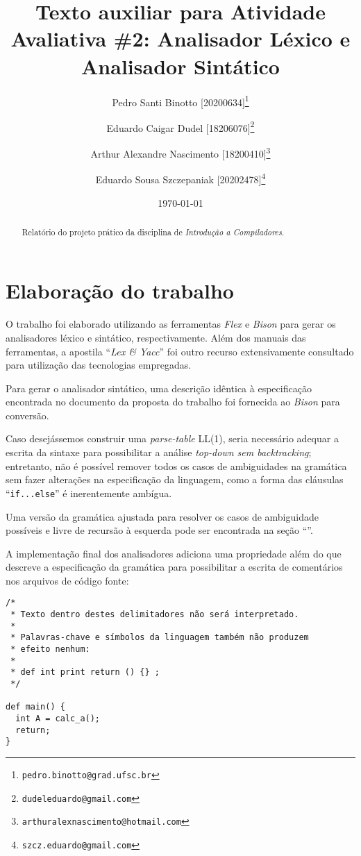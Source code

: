 \documentclass[12pt]{article}
\title{Texto auxiliar para Atividade Avaliativa \#2: Analisador Léxico e Analisador Sintático}
\author[1]{Pedro Santi Binotto [20200634]\thanks{\texttt{pedro.binotto@grad.ufsc.br}}}
\author[2]{Eduardo Caigar Dudel [18206076]\thanks{\texttt{dudeleduardo@gmail.com}}}
\author[3]{Arthur Alexandre Nascimento [18200410]\thanks{\texttt{arthuralexnascimento@hotmail.com}}}
\author[4]{Eduardo Sousa Szczepaniak [20202478]\thanks{\texttt{szcz.eduardo@gmail.com}}}
\date{\today}
\affil[1]{Departamento de Informática e Estatística, Universidade Federal de Santa Catarina}
\begin{document}
\begin{titlepage}
\maketitle
\thispagestyle{empty}

\begin{abstract}
  Relatório do projeto prático da disciplina de \textit{Introdução a Compiladores}.
\end{abstract}

\end{titlepage}

\newpage
\tableofcontents

\newpage
\section{Elaboração do trabalho}
\paragraph{}
O trabalho foi elaborado utilizando as ferramentas \textit{Flex}\cite{mitFlex1990} e \textit{Bison}\cite{mitBison1992}
para gerar os analisadores léxico e sintático, respectivamente. Além dos manuais das ferramentas, a apostila
``\textit{Lex \& Yacc}''\cite{niemannYacc} foi outro recurso extensivamente consultado para utilização das tecnologias
empregadas.

Para gerar o analisador sintático, uma descrição idêntica à especificação encontrada no documento da proposta do
trabalho foi fornecida ao \textit{Bison} para conversão. 

Caso desejássemos construir uma \textit{parse-table} LL(1), seria necessário adequar a escrita da sintaxe para
possibilitar a análise \textit{top-down sem backtracking}; entretanto, não é possível remover todos os casos de
ambiguidades na gramática sem fazer alterações na especificação da linguagem, como a forma das cláusulas
``\texttt{if...else}'' é inerentemente ambígua. 

Uma versão da gramática ajustada para resolver os casos de ambiguidade possíveis e livre de recursão à esquerda pode ser
encontrada na seção ``''.

A implementação final dos analisadores adiciona uma propriedade além do que descreve a especificação da gramática para
possibilitar a escrita de comentários nos arquivos de código fonte:

\begin{verbatim}
/*
 * Texto dentro destes delimitadores não será interpretado.
 *
 * Palavras-chave e símbolos da linguagem também não produzem
 * efeito nenhum:
 *
 * def int print return () {} ;
 */

def main() {
  int A = calc_a();
  return;
}
\end{verbatim}
\end{document}
